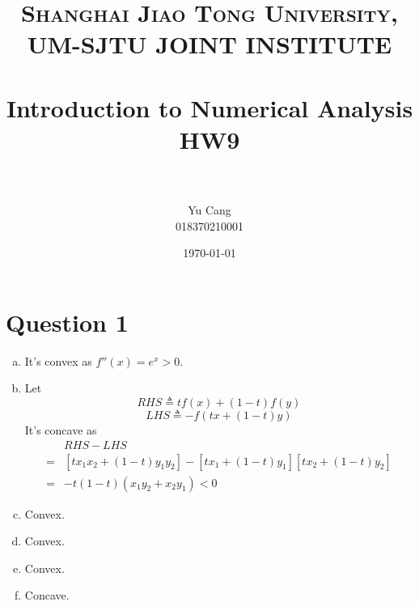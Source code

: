 \documentclass[paper=a4, fontsize=11pt]{scrartcl} %
\title{	
\normalfont \normalsize 
\textsc{Shanghai Jiao Tong University, UM-SJTU JOINT INSTITUTE} \\ [25pt] %
\horrule{0.5pt} \\[0.4cm] %
\huge Introduction to Numerical Analysis \\ HW9 \\ %
\horrule{2pt} \\[0.5cm] %
}
\author{Yu Cang \\ 018370210001} %
\date{\normalsize \today} %
\numberwithin{equation}{section} %
\numberwithin{figure}{section} %
\numberwithin{table}{section} %
\begin{document}
\maketitle %

\section{Question 1}
	\begin{enumerate}[(a)]
		\item
			It's convex as $f''(x) = e^x > 0$.
		\item 
			Let
			\begin{equation}
				RHS \triangleq t f(x) + (1-t)f(y)
			\end{equation}
			\begin{equation}
				LHS \triangleq - f(tx+(1-t)y)
			\end{equation}
			It's concave as
			\begin{equation}
				\begin{aligned}
				  & RHS-LHS\\
						   = &[t x_1 x_2 + (1-t)y_1 y_2] -[t x_1 + (1-t)y_1][t x_2 + (1-t)y_2]\\
						   = &-t(1-t)(x_1 y_2 + x_2 y_1) < 0
				\end{aligned}
			\end{equation}
		\item 
			Convex.
			
		\item 
			Convex.
			
		\item 
			Convex.
			
		\item 
			Concave.

	\end{enumerate}
\end{document}
